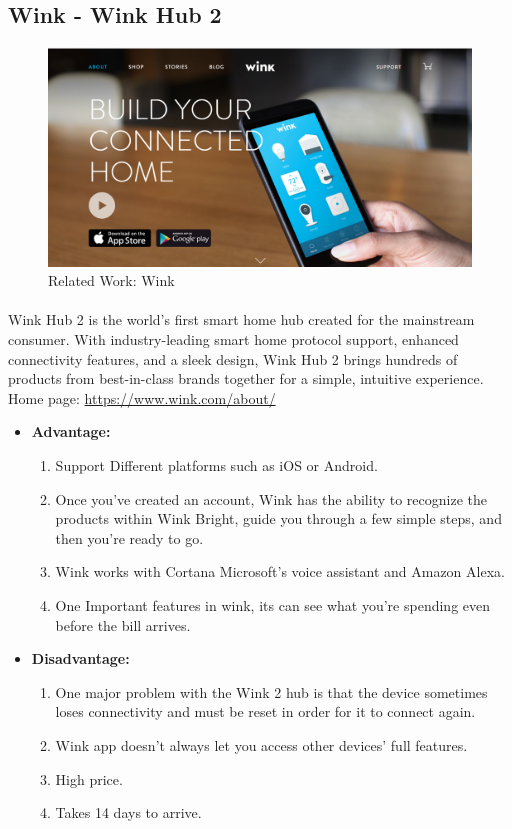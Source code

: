 \documentclass[a4paper, 12pt, oneside]{book}
\newcommand\boldcolor[1]{\textcolor{bold}{\textbf{#1}}}
\begin{document}
		\subsection{Wink - Wink Hub 2}
		\begin{figure}[H]
  			\caption{Related Work: Wink}
  			\includegraphics[width=\linewidth]{img/wink.png}
		\end{figure}
		\paragraph{}Wink Hub 2 is the world’s first smart home hub created for the mainstream consumer. With industry-leading smart home protocol support, enhanced connectivity features, and a sleek design, Wink Hub 2 brings hundreds of products from best-in-class brands together for a simple, intuitive experience. Home page: \url{https://www.wink.com/about/}
		
		\begin{itemize}
			\item \boldcolor{Advantage:}
			\begin{enumerate}
				\item Support Different platforms such as iOS or Android.
				\item Once you've created an account, Wink has the ability to recognize the products within Wink Bright, guide you through a few simple steps, and then you're ready to go.
				\item Wink works with Cortana Microsoft’s voice assistant and Amazon Alexa.
				\item One Important features in wink, its can see what you’re spending even before the bill arrives.
			\end{enumerate}
			\item \boldcolor{Disadvantage:} 
			\begin{enumerate}
				\item One major problem with the Wink 2 hub is that the device sometimes loses connectivity and must be reset in order for it to connect again.
				\item Wink app doesn't always let you access other devices' full features.
				\item High price.
				\item Takes 14 days to arrive.
			\end{enumerate}
		\end{itemize}
		\newpage
\end{document}
